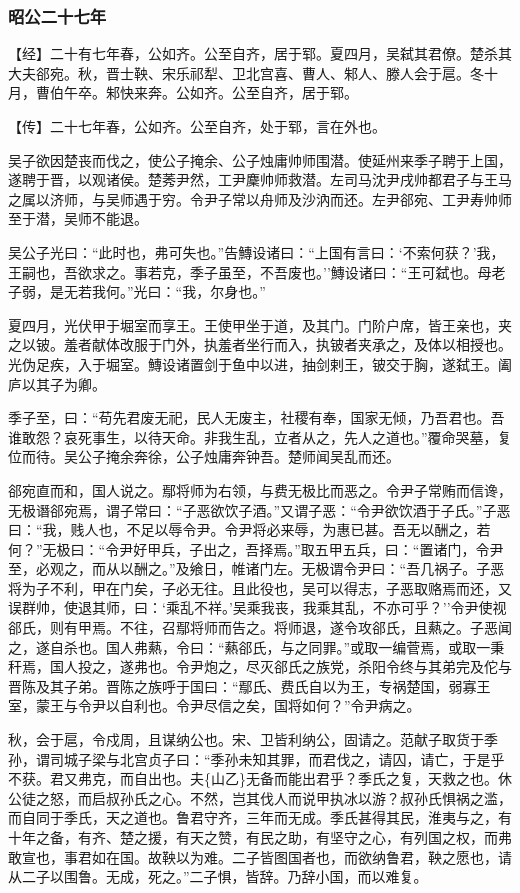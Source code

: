 \documentclass[]{article}
\begin{document}
\hypertarget{header-n2804}{%
\subsubsection{昭公二十七年}\label{header-n2804}}

【经】二十有七年春，公如齐。公至自齐，居于郓。夏四月，吴弑其君僚。楚杀其大夫郤宛。秋，晋士鞅、宋乐祁犁、卫北宫喜、曹人、邾人、滕人会于扈。冬十月，曹伯午卒。邾快来奔。公如齐。公至自齐，居于郓。

【传】二十七年春，公如齐。公至自齐，处于郓，言在外也。

吴子欲因楚丧而伐之，使公子掩余、公子烛庸帅师围潜。使延州来季子聘于上国，遂聘于晋，以观诸侯。楚莠尹然，工尹麇帅师救潜。左司马沈尹戌帅都君子与王马之属以济师，与吴师遇于穷。令尹子常以舟师及沙汭而还。左尹郤宛、工尹寿帅师至于潜，吴师不能退。

吴公子光曰：``此时也，弗可失也。''告鱄设诸曰：``上国有言曰：`不索何获？'我，王嗣也，吾欲求之。事若克，季子虽至，不吾废也。''鱄设诸曰：``王可弑也。母老子弱，是无若我何。''光曰：``我，尔身也。''

夏四月，光伏甲于堀室而享王。王使甲坐于道，及其门。门阶户席，皆王亲也，夹之以铍。羞者献体改服于门外，执羞者坐行而入，执铍者夹承之，及体以相授也。光伪足疾，入于堀室。鱄设诸置剑于鱼中以进，抽剑剌王，铍交于胸，遂弑王。阖庐以其子为卿。

季子至，曰：``苟先君废无祀，民人无废主，社稷有奉，国家无倾，乃吾君也。吾谁敢怨？哀死事生，以待天命。非我生乱，立者从之，先人之道也。''覆命哭墓，复位而待。吴公子掩余奔徐，公子烛庸奔钟吾。楚师闻吴乱而还。

郤宛直而和，国人说之。鄢将师为右领，与费无极比而恶之。令尹子常贿而信谗，无极谮郤宛焉，谓子常曰：``子恶欲饮子酒。''又谓子恶：``令尹欲饮酒于子氏。''子恶曰：``我，贱人也，不足以辱令尹。令尹将必来辱，为惠已甚。吾无以酬之，若何？''无极曰：``令尹好甲兵，子出之，吾择焉。''取五甲五兵，曰：``置诸门，令尹至，必观之，而从以酬之。''及飨日，帷诸门左。无极谓令尹曰：``吾几祸子。子恶将为子不利，甲在门矣，子必无往。且此役也，吴可以得志，子恶取赂焉而还，又误群帅，使退其师，曰：`乘乱不祥。'吴乘我丧，我乘其乱，不亦可乎？''令尹使视郤氏，则有甲焉。不往，召鄢将师而告之。将师退，遂令攻郤氏，且爇之。子恶闻之，遂自杀也。国人弗爇，令曰：``爇郤氏，与之同罪。''或取一编菅焉，或取一秉秆焉，国人投之，遂弗也。令尹炮之，尽灭郤氏之族党，杀阳令终与其弟完及佗与晋陈及其子弟。晋陈之族呼于国曰：``鄢氏、费氏自以为王，专祸楚国，弱寡王室，蒙王与令尹以自利也。令尹尽信之矣，国将如何？''令尹病之。

秋，会于扈，令戍周，且谋纳公也。宋、卫皆利纳公，固请之。范献子取货于季孙，谓司城子梁与北宫贞子曰：``季孙未知其罪，而君伐之，请囚，请亡，于是乎不获。君又弗克，而自出也。夫\{山乙\}无备而能出君乎？季氏之复，天救之也。休公徒之怒，而启叔孙氏之心。不然，岂其伐人而说甲执冰以游？叔孙氏惧祸之滥，而自同于季氏，天之道也。鲁君守齐，三年而无成。季氏甚得其民，淮夷与之，有十年之备，有齐、楚之援，有天之赞，有民之助，有坚守之心，有列国之权，而弗敢宣也，事君如在国。故鞅以为难。二子皆图国者也，而欲纳鲁君，鞅之愿也，请从二子以围鲁。无成，死之。''二子惧，皆辞。乃辞小国，而以难复。
\end{document}
